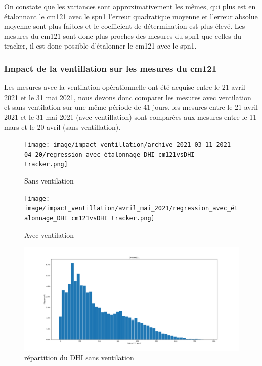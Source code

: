 \documentclass[12pt,a4paper]{article}
\begin{document}
\begin{flushleft}
On constate que les variances sont approximativement les mêmes, qui plus est en étalonnant le cm121 avec le spn1 l'erreur quadratique moyenne et l'erreur absolue moyenne sont plus faibles et le coefficient de détermination est plus élevé. Les mesures du cm121 sont donc plus proches des mesures du spn1 que celles du tracker, il est donc possible d'étalonner le cm121 avec le spn1.  

\subsubsection{Impact de la ventillation sur les mesures du cm121}

Les mesures avec la ventilation opérationnelle ont été acquise entre le 21 avril 2021 et le 31 mai 2021, nous devons donc comparer les mesures avec ventilation et sans ventilation sur une même période de 41 jours, les mesures entre le 21 avril 2021 et le 31 mai 2021 (avec ventillation) sont comparées aux mesures entre le 11 mars et le 20 avril (sans ventillation).

\begin{figure}[H]
\centering
\texttt{[image: image/impact\_ventillation/archive\_2021-03-11\_2021-04-20/regression\_avec\_étalonnage\_DHI cm121vsDHI tracker.png]}  
\caption{Sans ventilation}  
\end{figure}

\begin{figure}[H]
\centering
\texttt{[image: image/impact\_ventillation/avril\_mai\_2021/regression\_avec\_étalonnage\_DHI cm121vsDHI tracker.png]} 
\caption{Avec ventilation}  
\end{figure}



\begin{figure}[H]
\centering
\includegraphics[width=15cm]{image/impact_ventillation/archive_2021-03-11_2021-04-20/histogramme_3.png} 
\caption{répartition du DHI sans ventilation}  
\end{figure}


\end{flushleft}
\end{document}
